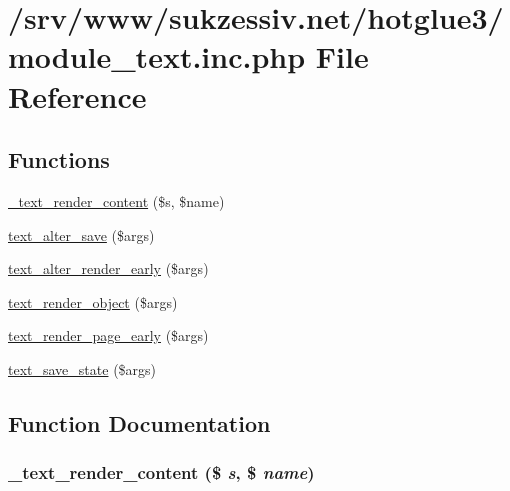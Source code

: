 \hypertarget{module__text_8inc_8php}{
\section{/srv/www/sukzessiv.net/hotglue3/module\_\-text.inc.php File Reference}
\label{module__text_8inc_8php}
}
\subsection*{Functions}
\begin{CompactItemize}
\item 
\hyperlink{module__text_8inc_8php_0586b5e177a15f5904d49b8b3aaf19ee}{\_\-text\_\-render\_\-content} (\$s, \$name)
\item 
\hyperlink{module__text_8inc_8php_aee0a89ba2b213f761b05ca2d6460910}{text\_\-alter\_\-save} (\$args)
\item 
\hyperlink{module__text_8inc_8php_c57835ba072c7df9367b2c277d2f5bd7}{text\_\-alter\_\-render\_\-early} (\$args)
\item 
\hyperlink{module__text_8inc_8php_8e9b1db22ff6cb0f3d20815da6aae6ce}{text\_\-render\_\-object} (\$args)
\item 
\hyperlink{module__text_8inc_8php_aaa8b8407d795f6dba9d258f1457ade8}{text\_\-render\_\-page\_\-early} (\$args)
\item 
\hyperlink{module__text_8inc_8php_7fa0ea2ee517914595d7eda355177289}{text\_\-save\_\-state} (\$args)
\end{CompactItemize}


\subsection{Function Documentation}
\hypertarget{module__text_8inc_8php_0586b5e177a15f5904d49b8b3aaf19ee}{
\subsubsection[{\_\-text\_\-render\_\-content}]{\setlength{\rightskip}{0pt plus 5cm}\_\-text\_\-render\_\-content (\$ {\em s}, \/  \$ {\em name})}}
\label{module__text_8inc_8php_0586b5e177a15f5904d49b8b3aaf19ee}


